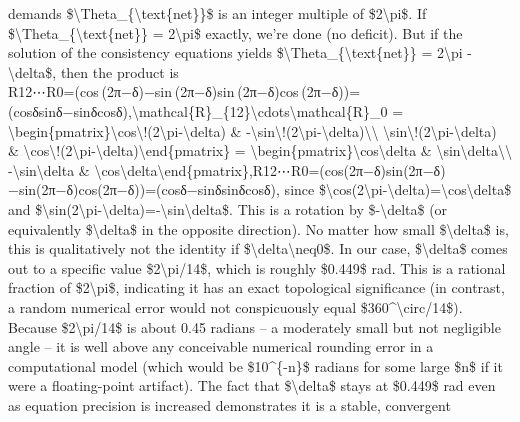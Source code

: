 \documentclass[]{article}
\begin{document}
demands \$\textbackslash{}Theta\_\{\textbackslash{}text\{net\}\}\$ is an
integer multiple of \$2\textbackslash{}pi\$. If
\$\textbackslash{}Theta\_\{\textbackslash{}text\{net\}\} =
2\textbackslash{}pi\$ exactly, we're done (no deficit). But if the
solution of the consistency equations yields
\$\textbackslash{}Theta\_\{\textbackslash{}text\{net\}\} =
2\textbackslash{}pi - \textbackslash{}delta\$, then the product is\\
R12⋯R0=(cos⁡ ⁣(2π−δ)−sin⁡ ⁣(2π−δ)sin⁡ ⁣(2π−δ)cos⁡ ⁣(2π−δ))=(cos⁡δsin⁡δ−sin⁡δcos⁡δ),\textbackslash{}mathcal\{R\}\_\{12\}\textbackslash{}cdots\textbackslash{}mathcal\{R\}\_0
=
\textbackslash{}begin\{pmatrix\}\textbackslash{}cos\textbackslash{}!(2\textbackslash{}pi-\textbackslash{}delta)
\&
-\textbackslash{}sin\textbackslash{}!(2\textbackslash{}pi-\textbackslash{}delta)\textbackslash{}\textbackslash{}
\textbackslash{}sin\textbackslash{}!(2\textbackslash{}pi-\textbackslash{}delta)
\&
\textbackslash{}cos\textbackslash{}!(2\textbackslash{}pi-\textbackslash{}delta)\textbackslash{}end\{pmatrix\}
=
\textbackslash{}begin\{pmatrix\}\textbackslash{}cos\textbackslash{}delta
\&
\textbackslash{}sin\textbackslash{}delta\textbackslash{}\textbackslash{}
-\textbackslash{}sin\textbackslash{}delta \&
\textbackslash{}cos\textbackslash{}delta\textbackslash{}end\{pmatrix\},R12​⋯R0​=(cos(2π−δ)sin(2π−δ)​−sin(2π−δ)cos(2π−δ)​)=(cosδ−sinδ​sinδcosδ​),
since
\$\textbackslash{}cos(2\textbackslash{}pi-\textbackslash{}delta)=\textbackslash{}cos\textbackslash{}delta\$
and
\$\textbackslash{}sin(2\textbackslash{}pi-\textbackslash{}delta)=-\textbackslash{}sin\textbackslash{}delta\$.
This is a rotation by \$-\textbackslash{}delta\$ (or equivalently
\$\textbackslash{}delta\$ in the opposite direction). No matter how
small \$\textbackslash{}delta\$ is, this is qualitatively not the
identity if \$\textbackslash{}delta\textbackslash{}neq0\$. In our case,
\$\textbackslash{}delta\$ comes out to a specific value
\$2\textbackslash{}pi/14\$, which is roughly \$0.449\$ rad. This is a
rational fraction of \$2\textbackslash{}pi\$, indicating it has an exact
topological significance (in contrast, a random numerical error would
not conspicuously equal \$360\^{}\textbackslash{}circ/14\$). Because
\$2\textbackslash{}pi/14\$ is about 0.45 radians -- a moderately small
but not negligible angle -- it is well above any conceivable numerical
rounding error in a computational model (which would be \$10\^{}\{-n\}\$
radians for some large \$n\$ if it were a floating-point artifact). The
fact that \$\textbackslash{}delta\$ stays at \$0.449\$ rad even as
equation precision is increased demonstrates it is a stable, convergent
\end{document}
